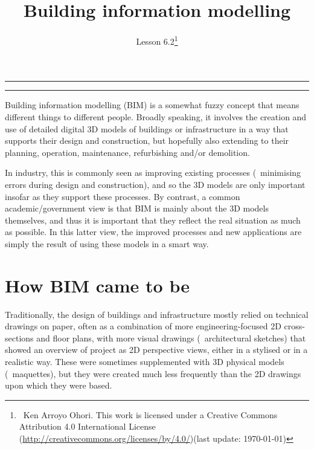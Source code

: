
\newcommand{\lessonNumber}{Lesson 6.2}

\newtheorem{definition}{Definition}

\title{Building information modelling}

\ohead*{\lessonNumber}
\titlehead{\thispagestyle{headings}}
\author{\lessonNumber\footnote{\ccbysa\ Ken Arroyo Ohori. This work is licensed under a Creative Commons Attribution 4.0 International License (\url{http://creativecommons.org/licenses/by/4.0/})\newline(last update: \today)}}
\date{}

\pagestyle{scrheadings}

\maketitle

\noindent\rule{5cm}{0.4pt}
\tableofcontents
\noindent\rule{5cm}{0.4pt}
\vspace{5mm}


Building information modelling (BIM) is a somewhat fuzzy concept that means different things to different people.
Broadly speaking, it involves the creation and use of detailed digital 3D models of buildings or infrastructure in a way that supports their design and construction, but hopefully also extending to their planning, operation, maintenance, refurbishing and/or demolition.

In industry, this is commonly seen as improving existing processes (\eg\ minimising errors during design and construction), and so the 3D models are only important insofar as they support these processes.
By contrast, a common academic/government view is that BIM is mainly about the 3D models themselves, and thus it is important that they reflect the real situation as much as possible.
In this latter view, the improved processes and new applications are simply the result of using these models in a smart way.

\section{How BIM came to be}

Traditionally, the design of buildings and infrastructure mostly relied on technical drawings on paper, often as a combination of more engineering-focused 2D cross-sections and floor plans, with more visual drawings (\eg\ architectural sketches) that showed an overview of project as 2D perspective views, either in a stylised or in a realistic way.
These were sometimes supplemented with 3D physical models (\ie\ maquettes), but they were created much less frequently than the 2D drawings upon which they were based.

